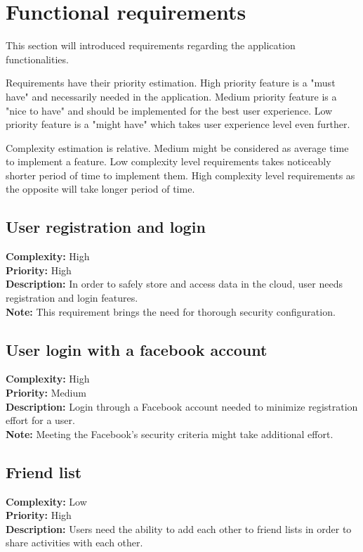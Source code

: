 
\section{Functional requirements}\label{sec:functional-requirements}

This section will introduced requirements regarding the application functionalities.

Requirements have their priority estimation.
High priority feature is a "must have" and necessarily needed in the application.
Medium priority feature is a "nice to have" and should be implemented for the best user experience.
Low priority feature is a "might have" which takes user experience level even further.

Complexity estimation is relative.
Medium might be considered as average time to implement a feature.
Low complexity level requirements takes noticeably shorter period of time to implement them.
High complexity level requirements as the opposite will take longer period of time.

\subsection{User registration and login}\label{subsec:user-registration-and-login}
\textbf{Complexity:} High\\
\textbf{Priority:} High\\
\textbf{Description:} In order to safely store and access data in the cloud, user needs registration and login features.\\
\textbf{Note:} This requirement brings the need for thorough security configuration.\\


\subsection{User login with a facebook account}\label{subsec:user-login-with-facebook-account}
\textbf{Complexity:} High\\
\textbf{Priority:} Medium\\
\textbf{Description:} Login through a Facebook account needed to minimize registration effort for a user.\\
\textbf{Note:} Meeting the Facebook's security criteria might take additional effort.\\


\subsection{Friend list}\label{subsec:friend-list}
\textbf{Complexity:} Low\\
\textbf{Priority:} High\\
\textbf{Description:} Users need the ability to add each other to friend lists in order to share activities with each other.\\


